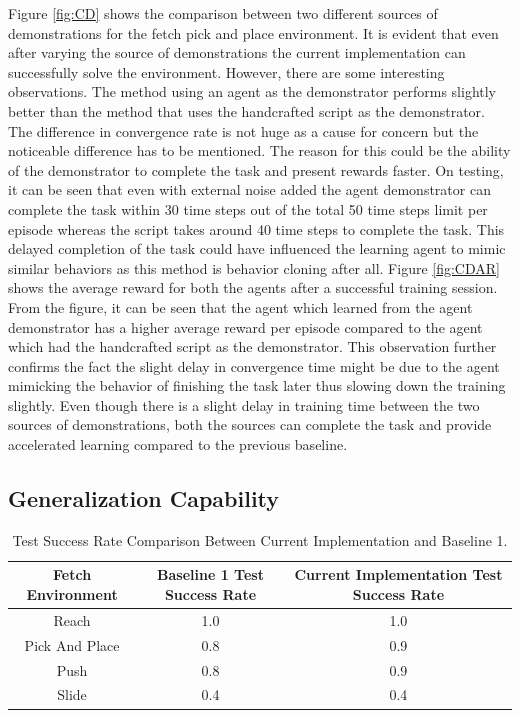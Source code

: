 Figure \ref{fig:CD} shows the comparison between two different sources of demonstrations for the fetch pick and place environment. It is evident that even after varying the source of demonstrations the current implementation can successfully solve the environment. However, there are some interesting observations. The method using an agent as the demonstrator performs slightly better than the method that uses the handcrafted script as the demonstrator. The difference in convergence rate is not huge as a cause for concern but the noticeable difference has to be mentioned. The reason for this could be the ability of the demonstrator to complete the task and present rewards faster. On testing, it can be seen that even with external noise added the agent demonstrator can complete the task within 30 time steps out of the total 50 time steps limit per episode whereas the script takes around 40 time steps to complete the task. This delayed completion of the task could have influenced the learning agent to mimic similar behaviors as this method is behavior cloning after all. Figure \ref{fig:CDAR} shows the average reward for both the agents after a successful training session. From the figure, it can be seen that the agent which learned from the agent demonstrator has a higher average reward per episode compared to the agent which had the handcrafted script as the demonstrator. This observation further confirms the fact the slight delay in convergence time might be due to the agent mimicking the behavior of finishing the task later thus slowing down the training slightly. Even though there is a slight delay in training time between the two sources of demonstrations, both the sources can complete the task and provide accelerated learning compared to the previous baseline. \\

\subsection{Generalization Capability}

\begin{table}[h!]
\begin{tabular}{|c|c|c|}
\hline
Fetch Environment & Baseline 1 Test Success Rate & Current Implementation Test Success Rate \\ \hline
Reach          & 1.0 & 1.0 \\ \hline
Pick And Place & 0.8 & 0.9 \\ \hline
Push           & 0.8 & 0.9 \\ \hline
Slide          & 0.4 & 0.4 \\ \hline
\end{tabular}
\caption{Test Success Rate Comparison Between Current Implementation and Baseline 1.}
\label{tab:GC}
\end{table}


